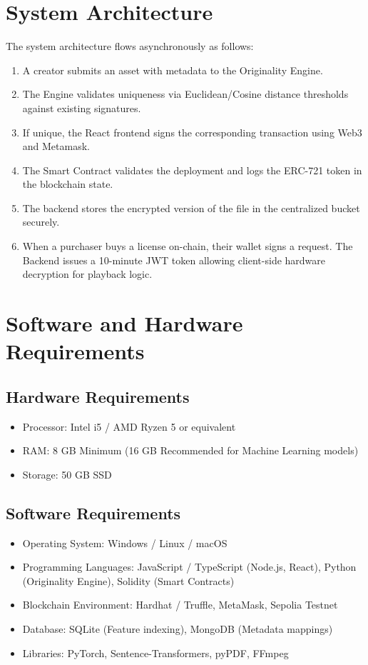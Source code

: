 \documentclass[12pt,a4paper]{report}
\begin{document}
\section{System Architecture}
The system architecture flows asynchronously as follows:
\begin{enumerate}
    \item A creator submits an asset with metadata to the Originality Engine.
    \item The Engine validates uniqueness via Euclidean/Cosine distance thresholds against existing signatures.
    \item If unique, the React frontend signs the corresponding transaction using Web3 and Metamask.
    \item The Smart Contract validates the deployment and logs the ERC-721 token in the blockchain state.
    \item The backend stores the encrypted version of the file in the centralized bucket securely.
    \item When a purchaser buys a license on-chain, their wallet signs a request. The Backend issues a 10-minute JWT token allowing client-side hardware decryption for playback logic.
\end{enumerate}

\section{Software and Hardware Requirements}
\subsection{Hardware Requirements}
\begin{itemize}
    \item Processor: Intel i5 / AMD Ryzen 5 or equivalent
    \item RAM: 8 GB Minimum (16 GB Recommended for Machine Learning models)
    \item Storage: 50 GB SSD
\end{itemize}

\subsection{Software Requirements}
\begin{itemize}
    \item Operating System: Windows / Linux / macOS
    \item Programming Languages: JavaScript / TypeScript (Node.js, React), Python (Originality Engine), Solidity (Smart Contracts)
    \item Blockchain Environment: Hardhat / Truffle, MetaMask, Sepolia Testnet
    \item Database: SQLite (Feature indexing), MongoDB (Metadata mappings)
    \item Libraries: PyTorch, Sentence-Transformers, pyPDF, FFmpeg
\end{itemize}
\end{document}
